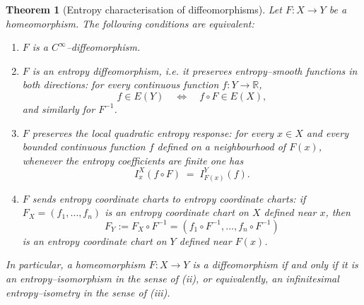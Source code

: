 \documentclass[11pt]{amsart}
\newtheorem{theorem}{Theorem}[section]
\theoremstyle{definition}
\theoremstyle{remark}
\begin{document}
\begin{theorem}[Entropy characterisation of diffeomorphisms]
\label{thm:entropy-diffeo}
Let $F:X\to Y$ be a homeomorphism. The following conditions are equivalent:
\begin{enumerate}
\item[\textnormal{(i)}] $F$ is a $C^\infty$--diffeomorphism.
\item[\textnormal{(ii)}] $F$ is an entropy diffeomorphism, i.e. it preserves entropy--smooth functions in both
directions: for every continuous function $f:Y\to\mathbb{R}$,
\[
  f\in  E(Y)
  \quad\Longleftrightarrow\quad
  f\circ F \in  E(X),
\]
and similarly for $F^{-1}$.

\item[\textnormal{(iii)}] $F$ preserves the local quadratic entropy response:
for every $x\in X$ and every bounded continuous function $f$ defined on a
neighbourhood of $F(x)$, whenever the entropy coefficients are finite one has
\[
  I^X_x(f\circ F)
  \;=\;
  I^Y_{F(x)}(f).
\]

\item[\textnormal{(iv)}] $F$ sends entropy coordinate charts to entropy coordinate
charts: if $F_X=(f_1,\dots,f_n)$ is an entropy coordinate chart on $X$ defined
near $x$, then 
\[
  F_Y := F_X\circ F^{-1} = (f_1\circ F^{-1},\dots,f_n\circ F^{-1})
\]
is an entropy coordinate chart on $Y$ defined near $F(x)$.
\end{enumerate}
In particular, a homeomorphism $F:X\to Y$ is a diffeomorphism if and only if it
is an entropy--isomorphism in the sense of \textnormal{(ii)}, or equivalently,
an infinitesimal entropy--isometry in the sense of \textnormal{(iii)}.
\end{theorem}
\end{document}

